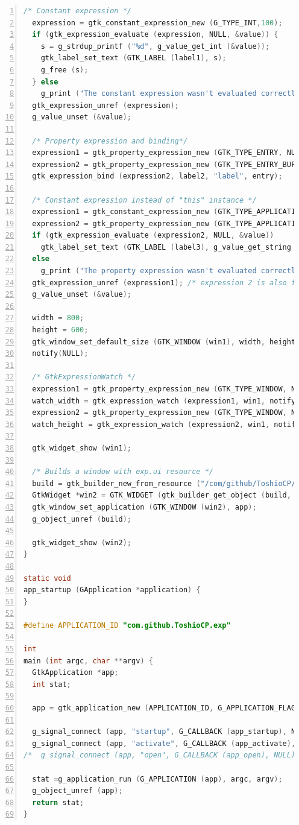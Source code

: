 \begin{lstlisting}[language=C, numbers=left]
  /* Constant expression */
  expression = gtk_constant_expression_new (G_TYPE_INT,100);
  if (gtk_expression_evaluate (expression, NULL, &value)) {
    s = g_strdup_printf ("%d", g_value_get_int (&value));
    gtk_label_set_text (GTK_LABEL (label1), s);
    g_free (s);
  } else
    g_print ("The constant expression wasn't evaluated correctly.\n");
  gtk_expression_unref (expression);
  g_value_unset (&value);

  /* Property expression and binding*/
  expression1 = gtk_property_expression_new (GTK_TYPE_ENTRY, NULL, "buffer");
  expression2 = gtk_property_expression_new (GTK_TYPE_ENTRY_BUFFER, expression1, "text");
  gtk_expression_bind (expression2, label2, "label", entry);

  /* Constant expression instead of "this" instance */
  expression1 = gtk_constant_expression_new (GTK_TYPE_APPLICATION, app);
  expression2 = gtk_property_expression_new (GTK_TYPE_APPLICATION, expression1, "application-id");
  if (gtk_expression_evaluate (expression2, NULL, &value))
    gtk_label_set_text (GTK_LABEL (label3), g_value_get_string (&value));
  else
    g_print ("The property expression wasn't evaluated correctly.\n");
  gtk_expression_unref (expression1); /* expression 2 is also freed. */
  g_value_unset (&value);

  width = 800;
  height = 600;
  gtk_window_set_default_size (GTK_WINDOW (win1), width, height);
  notify(NULL);

  /* GtkExpressionWatch */
  expression1 = gtk_property_expression_new (GTK_TYPE_WINDOW, NULL, "default-width");
  watch_width = gtk_expression_watch (expression1, win1, notify, NULL, NULL);
  expression2 = gtk_property_expression_new (GTK_TYPE_WINDOW, NULL, "default-height");
  watch_height = gtk_expression_watch (expression2, win1, notify, NULL, NULL);

  gtk_widget_show (win1);

  /* Builds a window with exp.ui resource */
  build = gtk_builder_new_from_resource ("/com/github/ToshioCP/exp/exp.ui");
  GtkWidget *win2 = GTK_WIDGET (gtk_builder_get_object (build, "win2"));
  gtk_window_set_application (GTK_WINDOW (win2), app);
  g_object_unref (build);

  gtk_widget_show (win2);
}

static void
app_startup (GApplication *application) {
}

#define APPLICATION_ID "com.github.ToshioCP.exp"

int
main (int argc, char **argv) {
  GtkApplication *app;
  int stat;

  app = gtk_application_new (APPLICATION_ID, G_APPLICATION_FLAGS_NONE);

  g_signal_connect (app, "startup", G_CALLBACK (app_startup), NULL);
  g_signal_connect (app, "activate", G_CALLBACK (app_activate), NULL);
/*  g_signal_connect (app, "open", G_CALLBACK (app_open), NULL);*/

  stat =g_application_run (G_APPLICATION (app), argc, argv);
  g_object_unref (app);
  return stat;
}
\end{lstlisting}

